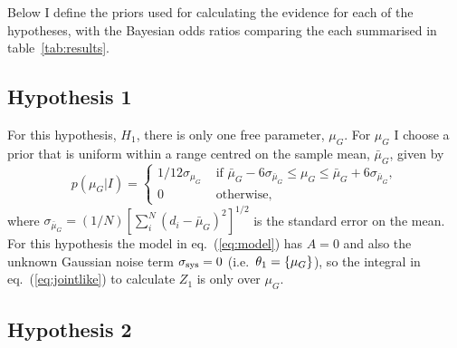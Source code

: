 \documentclass[page-classic]{epl2}
\begin{document}
Below I define the priors used for calculating the evidence for each of the hypotheses, with the Bayesian
odds ratios comparing the each summarised in table~\ref{tab:results}.

\subsection{Hypothesis 1}

For this hypothesis, $H_1$, there is only one free parameter, $\mu_G$. For $\mu_G$ I choose a prior that is
uniform within a range centred on the sample mean, $\bar{\mu}_G$, given by
\begin{equation}
 p(\mu_G|I) = \begin{cases}
               1/12\sigma_{\mu_G}&\text{ if }\bar{\mu}_G-6\sigma_{\bar{\mu}_G} \leq \mu_G \leq \bar{\mu}_G+6\sigma_{\bar{\mu}_G}, \\
               0&\text{ otherwise},
              \end{cases}
\end{equation}
where $\sigma_{\bar{\mu}_G} = (1/N)[\sum_i^N (d_i - \bar{\mu}_G)^2]^{1/2}$ is the standard error on the mean.
For this hypothesis the model in eq.~(\ref{eq:model}) has $A=0$ and also the unknown Gaussian noise term
$\sigma_{\rm sys}=0$ (i.e.\ $\mathbf{\theta}_1 = \{\mu_G\}$), so the integral in  eq.~(\ref{eq:jointlike}) to
calculate $Z_1$ is only over $\mu_G$.

\subsection{Hypothesis 2}
\end{document}
